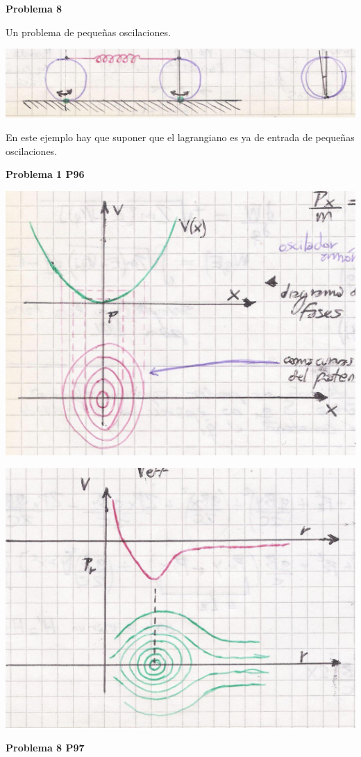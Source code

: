 \documentclass[10pt,oneside]{CBFT_book}
\begin{document}
\begin{ejemplo}{\bf Problema 8}

Un problema de pequeñas oscilaciones.

\includegraphics[scale=0.5]{images/fig_mc_problema_8.jpg} 

En este ejemplo hay que suponer que el lagrangiano es ya de entrada de pequeñas oscilaciones.

\end{ejemplo}

\begin{ejemplo}{\bf Problema 1 P96}
 
\includegraphics[scale=0.5]{images/fig_mc_problema_1_p96.jpg} 

\includegraphics[scale=0.5]{images/fig_mc_problema_1_p96_2.jpg} 
 
\end{ejemplo}


\begin{ejemplo}{\bf Problema 8 P97}
 
\end{ejemplo}









\end{document}
